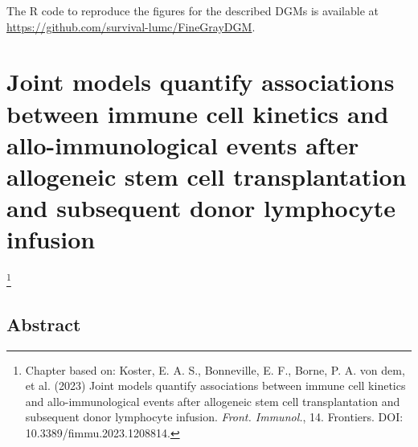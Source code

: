 \documentclass[
  letterpaper,
  paper=240mm:170mm,
  twoside=true,
  open=right,
  fontsize=10pt,
  pagesize=false,
  BCOR=15mm,
  DIV=14,
  headinclude=true,
  footinclude=false,
  headsepline=on]{scrbook}
\newcommand\blfootnote[1]{%
  \begingroup
  \renewcommand\thefootnote{}\footnote{#1}%
  \addtocounter{footnote}{-1}%
  \endgroup
}
\begin{document}

The R code to reproduce the figures for the described DGMs is available
at \url{https://github.com/survival-lumc/FineGrayDGM}.


\chapter{Joint models quantify associations between immune cell kinetics
and allo-immunological events after allogeneic stem cell transplantation
and subsequent donor lymphocyte infusion}\label{sec-chap-JM-DLI}


\blfootnote{Chapter based on: Koster, E. A. S., Bonneville, E. F., Borne, P. A. von dem, et al. (2023) Joint models quantify associations between immune cell kinetics and allo-immunological events after allogeneic stem cell transplantation and subsequent donor lymphocyte infusion. \textit{Front. Immunol.}, 14. Frontiers. DOI: 10.3389/fimmu.2023.1208814.}

\clearpage

\section*{Abstract}\label{abstract-4}

\end{document}
